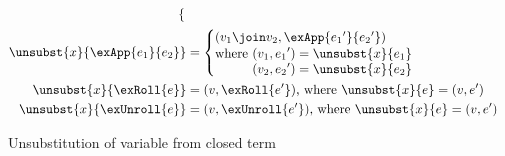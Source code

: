 \begin{figure*}
\begin{align*}
\begin{cases}
\end{cases}
\\
\unsubst{x}{\exApp{e_1}{e_2}}
&=
\begin{cases}
(v_1 \join v_2, \exApp{{e_1}'}{{e_2}'})
\\
\begin{aligned}
\text{where }
&
(v_1, {e_1}') = \unsubst{x}{e_1}
\\
&
(v_2, {e_2}') = \unsubst{x}{e_2}
\end{aligned}
\end{cases}
\\
\unsubst{x}{\exRoll{e}}
&=
(v,\exRoll{e'})\text{, where }\unsubst{x}{e} = (v,e')
\\
\unsubst{x}{\exUnroll{e}}
&=
(v,\exUnroll{e'})\text{, where }\unsubst{x}{e} = (v,e')
\end{align*}
\caption{Unsubstitution of variable from closed term}
\end{figure*}
